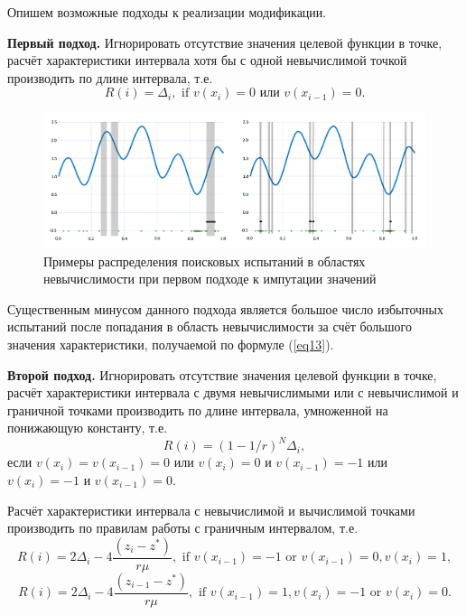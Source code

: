 \documentclass[10pt,a4paper]{book}
\begin{document}
Опишем возможные подходы к реализации модификации.

\textbf{Первый подход.} Игнорировать отсутствие значения целевой функции в точке, расчёт характеристики интервала хотя бы с одной невычислимой точкой производить по длине интервала, т.е.
\begin{equation}\label{eq13} 
R(i)=\Delta _i, \text{ if } v(x_i)=0 \text{ или } v(x_{i-1})=0.
\end{equation}

\begin{figure}
\includegraphics[width=\textwidth]{pic/fig1.png}
\caption{Примеры распределения поисковых испытаний в областях невычислимости при первом подходе к импутации значений} \label{fig1}
\end{figure}

Существенным минусом данного подхода является большое число избыточных испытаний после попадания в область невычислимости за счёт большого значения характеристики, получаемой по формуле (\ref{eq13}).

\textbf{Второй подход.} Игнорировать отсутствие значения целевой функции в точке, расчёт характеристики интервала с двумя невычислимыми или с невычислимой и граничной точками производить по длине интервала, умноженной на понижающую константу, т.е.
\begin{equation}\label{eq14} 
R(i)={(1-{1}/{r})}^N \Delta _i,
\end{equation}
если $v(x_i)=v(x_{i-1})=0$ или $v(x_i)=0$ и $v(x_{i-1})=-1$ или $v(x_i)=-1$ и $v(x_{i-1})=0$.

Расчёт характеристики интервала с невычислимой и вычислимой точками производить по правилам работы с граничным интервалом, т.е.
\begin{equation}\label{eq15} 
R(i)=2\Delta _i-4 \frac {(z_i-z^*)}{r \mu},\text{ if } v(x_{i-1})=-1  \text{ or } v(x_{i-1})=0, v(x_i)=1,
\end{equation}
\begin{equation}\label{eq16} 
R(i)=2\Delta _i-4 \frac {(z_{i-1}-z^*)}{r \mu},\text{ if } v(x_{i-1})=1, v(x_i)=-1 \text{ or } v(x_i)=0.
\end{equation}
\end{document}
